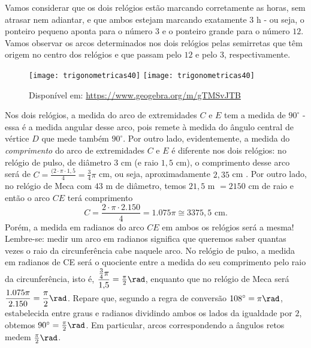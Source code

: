 Vamos considerar que os dois relógios estão marcando corretamente as horas, sem atrasar nem adiantar, e que ambos estejam marcando exatamente $3$ h - ou seja, o ponteiro pequeno aponta para o número $3$ e o ponteiro grande para o número $12$. Vamos observar os arcos determinados nos dois relógios pelas semirretas que têm origem no centro dos relógios e que passam pelo $12$ e pelo $3$, respectivamente.

\begin{figure}[H]
\centering

\texttt{[image: trigonometricas40]}
\hspace{2em}
\texttt{[image: trigonometricas40]}
\caption{Disponível em: \url{https://www.geogebra.org/m/gTMSvJTB}}
\label{}
\end{figure}

Nos dois relógios, a medida do arco de extremidades $C$ e $E$ tem a medida de $90^{\circ}$ - essa é a medida angular desse arco, pois remete à medida do ângulo central de vértice $D$ que mede também $90^{\circ}$. Por outro lado, evidentemente, a medida do \textit{comprimento} do arco de extremidades $C$ e $E$ é diferente nos dois relógios: no relógio de pulso, de diâmetro $3$ cm (e raio $1{,}5$ cm), o comprimento desse arco será de $C=\frac{(2\cdot\pi\cdot1{,}5}{4}=\frac{3}{4}\pi$ cm, ou seja, aproximadamente $2{,}35$ cm . Por outro lado, no relógio de Meca com $43$ m de diâmetro, temos $21{,}5\text{ m } = 2150$ cm de raio e então o arco $CE$ terá comprimento  
\begin{equation*}
C=\dfrac{2\cdot\pi\cdot2.150}{4}=1.075\pi\cong3375{,}5\text{ cm}.
\end{equation*}
Porém, a medida em radianos do arco $CE$ em ambos os relógios será a mesma! Lembre-se: medir um arco em radianos significa que queremos saber quantas vezes o raio da circunferência cabe naquele arco. No relógio de pulso, a medida em radianos de CE será o quociente entre a medida do seu comprimento pelo raio da circunferência, isto é, $\dfrac{\frac{3}{4}\pi}{1{,}5}=\frac{\pi}{2}\rad$, enquanto que no relógio de Meca será $\dfrac{1.075\pi}{2.150}=\dfrac{\pi}{2}\rad$. Repare que, segundo a regra de conversão $108^{\circ}=\pi\rad$, estabelecida entre graus e radianos dividindo ambos os lados da igualdade por $2$, obtemos $90^{\circ}=\frac{\pi}{2}\rad$. Em particular, arcos correspondendo a ângulos retos medem $\frac{\pi}{2}\rad$.

